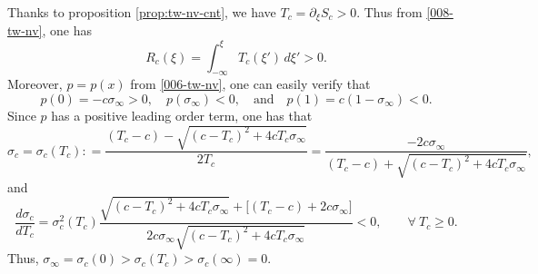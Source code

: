 \documentclass[12pt]{article}
\theoremstyle{definition}
\theoremstyle{remark}
\numberwithin{equation}{section}
\begin{document}
Thanks to proposition \ref{prop:tw-nv-cnt}, we have $ T_c = \partial_\xi S_c > 0 $. Thus from \eqref{008-tw-nv}, one has 
\begin{equation}
    \label{401-tw-nv}
    R_c(\xi) = \int_{-\infty}^\xi T_c(\xi')\,d\xi' > 0.
\end{equation}
Moreover, $ p = p(x) $ from \eqref{006-tw-nv}, one can easily verify that
\begin{equation}
    \label{402-tw-nv}
    p(0) = - c \sigma_\infty > 0, \quad p(\sigma_\infty) < 0, \quad \text{and} \quad  p(1) = c(1-\sigma_\infty)  < 0.
\end{equation}
Since $ p $ has a positive leading order term, one has that 
\begin{equation}
    \label{403-tw-nv}
    \sigma_c = \sigma_c(T_c) : = \frac{(T_c - c) - \sqrt{(c-T_c)^2 + 4 c T_c \sigma_\infty}}{2 T_c} = \frac{-2 c \sigma_\infty}{(T_c-c) + \sqrt{(c-T_c)^2 + 4 c T_c \sigma_\infty}},
\end{equation}
and
\begin{equation}
    \label{404-tw-nv}
    \frac{d\sigma_c}{dT_c} = \sigma_c^2(T_c) \frac{ \sqrt{(c-T_c)^2 + 4c T_c \sigma_\infty} + \lbrack (T_c - c) + 2 c \sigma_\infty \rbrack }{ 2c\sigma_\infty \sqrt{(c-T_c)^2 + 4c T_c \sigma_\infty}} < 0,  \qquad \forall \ T_c \geq 0. 
\end{equation}
Thus, $ \sigma_\infty = \sigma_c(0) > \sigma_c(T_c) > \sigma_c(\infty) = 0 $. 
\end{document}
